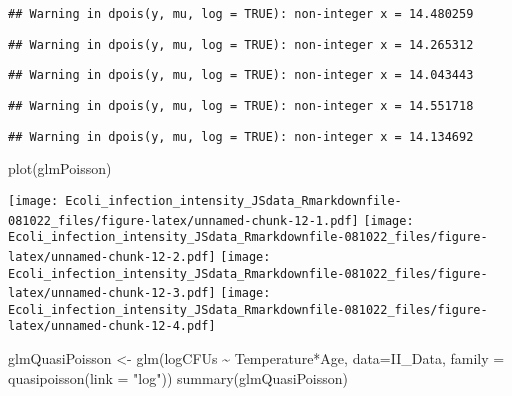 \documentclass[
]{article}
\newenvironment{Shaded}{\begin{snugshade}}{\end{snugshade}}
\newcommand{\AttributeTok}[1]{\textcolor[rgb]{0.77,0.63,0.00}{#1}}
\newcommand{\FunctionTok}[1]{\textcolor[rgb]{0.00,0.00,0.00}{#1}}
\newcommand{\NormalTok}[1]{#1}
\newcommand{\OtherTok}[1]{\textcolor[rgb]{0.56,0.35,0.01}{#1}}
\newcommand{\SpecialCharTok}[1]{\textcolor[rgb]{0.00,0.00,0.00}{#1}}
\newcommand{\StringTok}[1]{\textcolor[rgb]{0.31,0.60,0.02}{#1}}
\begin{document}
\begin{verbatim}
## Warning in dpois(y, mu, log = TRUE): non-integer x = 14.480259
\end{verbatim}

\begin{verbatim}
## Warning in dpois(y, mu, log = TRUE): non-integer x = 14.265312
\end{verbatim}

\begin{verbatim}
## Warning in dpois(y, mu, log = TRUE): non-integer x = 14.043443
\end{verbatim}

\begin{verbatim}
## Warning in dpois(y, mu, log = TRUE): non-integer x = 14.551718
\end{verbatim}

\begin{verbatim}
## Warning in dpois(y, mu, log = TRUE): non-integer x = 14.134692
\end{verbatim}

\begin{Shaded}
\begin{Highlighting}[]
\FunctionTok{plot}\NormalTok{(glmPoisson)}
\end{Highlighting}
\end{Shaded}

\texttt{[image: Ecoli\_infection\_intensity\_JSdata\_Rmarkdownfile-081022\_files/figure-latex/unnamed-chunk-12-1.pdf]}
\texttt{[image: Ecoli\_infection\_intensity\_JSdata\_Rmarkdownfile-081022\_files/figure-latex/unnamed-chunk-12-2.pdf]}
\texttt{[image: Ecoli\_infection\_intensity\_JSdata\_Rmarkdownfile-081022\_files/figure-latex/unnamed-chunk-12-3.pdf]}
\texttt{[image: Ecoli\_infection\_intensity\_JSdata\_Rmarkdownfile-081022\_files/figure-latex/unnamed-chunk-12-4.pdf]}

\begin{Shaded}
\begin{Highlighting}[]
\NormalTok{glmQuasiPoisson }\OtherTok{\textless{}{-}} \FunctionTok{glm}\NormalTok{(logCFUs }\SpecialCharTok{\textasciitilde{}}\NormalTok{ Temperature}\SpecialCharTok{*}\NormalTok{Age, }\AttributeTok{data=}\NormalTok{II\_Data, }\AttributeTok{family =} \FunctionTok{quasipoisson}\NormalTok{(}\AttributeTok{link =} \StringTok{"log"}\NormalTok{))}
\FunctionTok{summary}\NormalTok{(glmQuasiPoisson)}
\end{Highlighting}
\end{Shaded}
\end{document}
